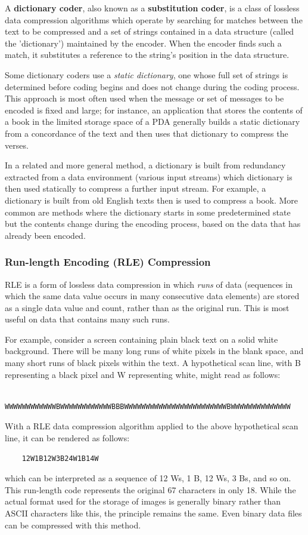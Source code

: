     A \textbf{dictionary coder}, also known as a \textbf{substitution coder}, is a class of lossless data compression algorithms which operate by searching for matches between the text to be compressed and a set of strings contained in a data structure (called the 'dictionary') maintained by the encoder. When the encoder finds such a match, it substitutes a reference to the string's position in the data structure. 

    Some dictionary coders use a \textit{static dictionary}, one whose full set of strings is determined before coding begins and does not change during the coding process. This approach is most often used when the message or set of messages to be encoded is fixed and large; for instance, an application that stores the contents of a book in the limited storage space of a PDA generally builds a static dictionary from a concordance of the text and then uses that dictionary to compress the verses. 

    In a related and more general method, a dictionary is built from redundancy extracted from a data environment (various input streams) which dictionary is then used statically to compress a further input stream. For example, a dictionary is built from old English texts then is used to compress a book. More common are methods where the dictionary starts in some predetermined state but the contents change during the encoding process, based on the data that has already been encoded. 

    \subsubsection{Run-length Encoding (RLE) Compression}
    RLE is a form of lossless data compression in which \textit{runs} of data (sequences in which the same data value occurs in many consecutive data elements) are stored as a single data value and count, rather than as the original run. This is most useful on data that contains many such runs.

    For example, consider a screen containing plain black text on a solid white background. There will be many long runs of white pixels in the blank space, and many short runs of black pixels within the text. A hypothetical scan line, with B representing a black pixel and W representing white, might read as follows: 
    \begin{lstlisting}
    WWWWWWWWWWWWBWWWWWWWWWWWWBBBWWWWWWWWWWWWWWWWWWWWWWWWBWWWWWWWWWWWWWW
    \end{lstlisting}
    With a RLE data compression algorithm applied to the above hypothetical scan line, it can be rendered as follows: 
    \begin{lstlisting}
    12W1B12W3B24W1B14W
    \end{lstlisting}
    which can be interpreted as a sequence of 12 Ws, 1 B, 12 Ws, 3 Bs, and so on. This run-length code represents the original 67 characters in only 18. While the actual format used for the storage of images is generally binary rather than ASCII characters like this, the principle remains the same. Even binary data files can be compressed with this method. 

